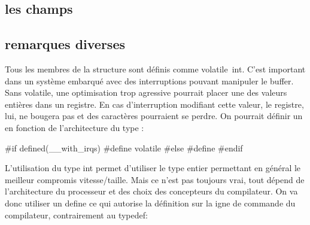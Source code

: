 \documentclass{scrartcl}%
\begin{document}
\nwendcode{}\nwdocspar
\subsection{les champs}
\subsection{remarques diverses}
Tous les membres de la structure sont définis comme {\Tt{}volatile\ int\nwendquote}. C'est important dans un système embarqué avec des interruptions pouvant manipuler le buffer. Sans {\Tt{}volatile\nwendquote}, une optimisation trop agressive pourrait placer une des valeurs entières dans un registre. En cas d'interruption modifiant cette valeur, le registre, lui, ne bougera pas et des caractères pourraient se perdre.
On pourrait définir un {\Tt{}\nwendquote} en fonction de l'architecture du type :

\nwenddocs{}\endmoddef\nwstartdeflinemarkup{}\nwenddeflinemarkup

#if defined(__with_irqs)
  #define  volatile
#else
  #define 
#endif

\eatline
{}\nwendcode{}L'utilisation du type {\Tt{}int\nwendquote} permet d'utiliser le type entier permettant en général le meilleur compromis vitesse/taille. Mais ce n'est pas toujours vrai, tout dépend de l'architecture du processeur et des choix des concepteurs du compilateur. On va donc utiliser un {\Tt{}define\nwendquote} ce qui autorise la définition sur la igne de commande du compilateur, contrairement au {\Tt{}typedef\nwendquote}:
\end{document}
